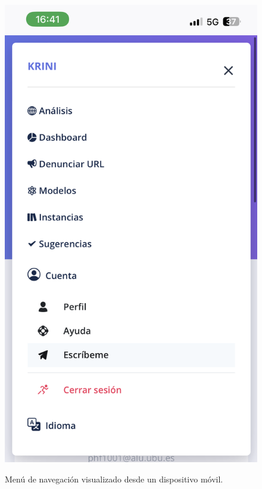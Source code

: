 \begin{figure}[h]
	\caption[Manual de usuario: menú (versión móvil)]{Menú de navegación visualizado desde un dispositivo móvil.}
	\centering
	\includegraphics[scale=0.1]{../img/anexos/user_guide/0_menu_mobile}
	\label{e-0:menu-mobile}
\end{figure}